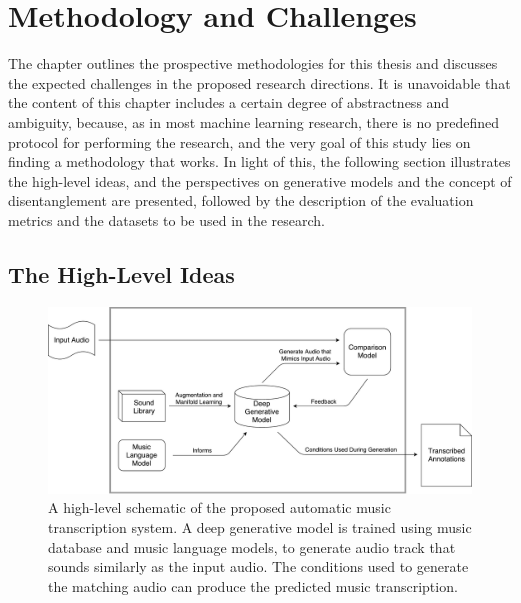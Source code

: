 
\graphicspath{{4-methods/figures/}}
\chapter{Methodology and Challenges}
\label{ch:methods}

The chapter outlines the prospective methodologies for this thesis and discusses the expected challenges in the proposed research directions.
It is unavoidable that the content of this chapter includes a certain degree of abstractness and ambiguity, because, as in most machine learning research, there is no predefined protocol for performing the research, and the very goal of this study lies on finding a methodology that works.
In light of this, the following section illustrates the high-level ideas, and the perspectives on generative models and the concept of disentanglement are presented, followed by the description of the evaluation metrics and the datasets to be used in the research.


\section{The High-Level Ideas}

\begin{figure}
	\includegraphics[width=\textwidth]{grand.pdf}
	\caption{A high-level schematic of the proposed automatic music transcription system. A deep generative model is trained using music database and music language models, to generate audio track that sounds similarly as the input audio. The conditions used to generate the matching audio can produce the predicted music transcription. }\label{fig:grand}
\end{figure}

